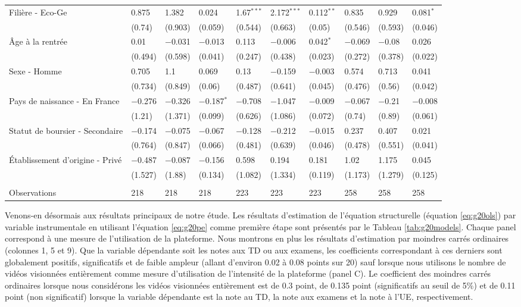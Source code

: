 \documentclass[
]{book}
\begin{document}
\begin{landscape}
\begin{ThreePartTable}
\begin{longtable}[t]{llllllllll}
Filière - Eco-Ge & 0.875 & 1.382 & 0.024 & 1.67$^{***}$ & 2.172$^{***}$ & 0.112$^{**}$ & 0.835 & 0.929 & 0.081$^{*}$\\
 & (0.74) & (0.903) & (0.059) & (0.544) & (0.663) & (0.05) & (0.546) & (0.593) & (0.046)\\
Âge à la rentrée & 0.01 & $-$0.031 & $-$0.013 & 0.113 & $-$0.006 & 0.042$^{*}$ & $-$0.069 & $-$0.08 & 0.026\\
 & (0.494) & (0.598) & (0.041) & (0.247) & (0.438) & (0.023) & (0.272) & (0.378) & (0.022)\\
Sexe - Homme & 0.705 & 1.1 & 0.069 & 0.13 & $-$0.159 & $-$0.003 & 0.574 & 0.713 & 0.041\\
 & (0.734) & (0.849) & (0.06) & (0.487) & (0.641) & (0.045) & (0.476) & (0.56) & (0.042)\\
Pays de naissance - En France & $-$0.276 & $-$0.326 & $-$0.187$^{*}$ & $-$0.708 & $-$1.047 & $-$0.009 & $-$0.067 & $-$0.21 & $-$0.008\\
 & (1.21) & (1.371) & (0.099) & (0.626) & (1.086) & (0.072) & (0.74) & (0.89) & (0.061)\\
Statut de boursier - Secondaire & $-$0.174 & $-$0.075 & $-$0.067 & $-$0.128 & $-$0.212 & $-$0.015 & 0.237 & 0.407 & 0.021\\
 & (0.764) & (0.847) & (0.066) & (0.481) & (0.639) & (0.046) & (0.478) & (0.551) & (0.041)\\
Établissement d'origine - Privé & $-$0.487 & $-$0.087 & $-$0.156 & 0.598 & 0.194 & 0.181 & 1.02 & 1.175 & 0.045\\
 & (1.527) & (1.88) & (0.134) & (1.082) & (1.334) & (0.119) & (1.173) & (1.279) & (0.125)\\
 &  &  &  &  &  &  &  &  & \\
Observations & 218 & 218 & 218 & 223 & 223 & 223 & 258 & 258 & 258\\*
\end{longtable}
\end{ThreePartTable}
\endgroup{}
\end{landscape}

Venons-en désormais aux résultats principaux de notre étude. Les résultats d'estimation de l'équation structurelle (équation \ref{eq:g20ols}) par variable instrumentale en utilisant l'équation \eqref{eq:g20pe} comme première étape sont présentés par le Tableau \ref{tab:g20models}. Chaque panel correspond à une mesure de l'utilisation de la plateforme. Nous montrons en plus les résultats d'estimation par moindres carrés ordinaires (colonnes 1, 5 et 9). Que la variable dépendante soit les notes aux TD ou aux examens, les coefficients correspondant à ces derniers sont globalement positifs, significatifs et de faible ampleur (allant d'environ 0.02 à 0.08 points sur 20) sauf lorsque nous utilisons le nombre de vidéos visionnées entièrement comme mesure d'utilisation de l'intensité de la plateforme (panel C).
Le coefficient des moindres carrés ordinaires lorsque nous considérons les vidéos visionnées entièrement est de 0.3 point, de 0.135 point (significatifs au seuil de 5\%) et de 0.11 point (non significatif) lorsque la variable dépendante est la note au TD, la note aux examens et la note à l'UE, respectivement.
\end{document}

